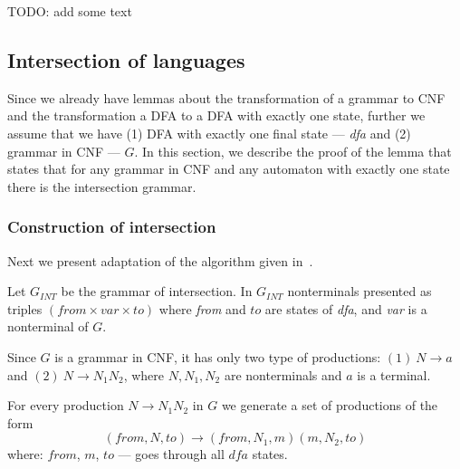 





TODO: add some text



\subsection{Intersection of languages}

Since we already have lemmas about the transformation of a grammar to CNF and the transformation a DFA to a DFA with exactly one state, further we assume that we have (1) DFA with exactly one final state --- \textit{dfa} and (2) grammar in CNF --- $G$. In this section, we describe the proof of the lemma that states that for any grammar in CNF and any automaton with exactly one state there is the intersection grammar.

\subsubsection{Construction of intersection}

Next we present adaptation of the algorithm given in~\cite{beigelproof}. 

Let $G_{INT}$ be the grammar of intersection. In $G_{INT}$ nonterminals presented as triples $(from \times var \times to) $ where \textit{from} and $to$ are states of \textit{dfa}, and \textit{var} is a nonterminal of $G$.

Since $G$ is a grammar in CNF, it has only two type of productions: $(1)\ N \to a $ and $(2) \ N \to N_{1} N_{2}$, where $N, N_1, N_2$ are nonterminals and $a$ is a terminal.

For every production $N \to N_1 N_2$ in $G$ we generate a set of productions of the form $$(from, N, to) \to (from, N_1,  m) (m, N_2, to)$$ where: $from$, $m$, $to$ --- goes through all $\textit{dfa}$ states.

